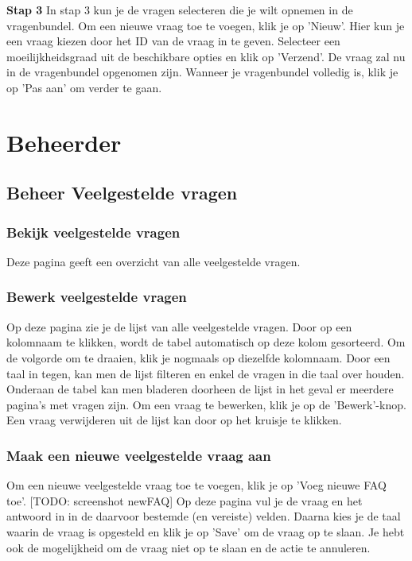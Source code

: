 \documentclass[]{article}
\begin{document}
\textbf{Stap 3}
In stap 3 kun je de vragen selecteren die je wilt opnemen in de vragenbundel. Om een nieuwe vraag toe te voegen, klik je op 'Nieuw'. Hier kun je een vraag kiezen door het ID van de vraag in te geven. Selecteer een moeilijkheidsgraad uit de beschikbare opties en klik op 'Verzend'. De vraag zal nu in de vragenbundel opgenomen zijn. Wanneer je vragenbundel volledig is, klik je op 'Pas aan' om verder te gaan.

\section{Beheerder}

\subsection{Beheer Veelgestelde vragen}

\subsubsection{Bekijk veelgestelde vragen}
Deze pagina geeft een overzicht van alle veelgestelde vragen.

\subsubsection{Bewerk veelgestelde vragen}
Op deze pagina zie je de lijst van alle veelgestelde vragen. Door op een kolomnaam te klikken, wordt de tabel automatisch op deze kolom gesorteerd. Om de volgorde om te draaien, klik je nogmaals op diezelfde kolomnaam. Door een taal in tegen, kan men de lijst filteren en enkel de vragen in die taal over houden. Onderaan de tabel kan men bladeren doorheen de lijst in het geval er meerdere pagina's met vragen zijn. Om een vraag te bewerken, klik je op de 'Bewerk'-knop. Een vraag verwijderen uit de lijst kan door op het kruisje te klikken.

\subsubsection{Maak een nieuwe veelgestelde vraag aan}
Om een nieuwe veelgestelde vraag toe te voegen, klik je op 'Voeg nieuwe FAQ toe'. [TODO: screenshot newFAQ] Op deze pagina vul je de vraag en het antwoord in in de daarvoor bestemde (en vereiste) velden. Daarna kies je de taal waarin de vraag is opgesteld en klik je op 'Save' om de vraag op te slaan. Je hebt ook de mogelijkheid om de vraag niet op te slaan en de actie te annuleren.
\end{document}
